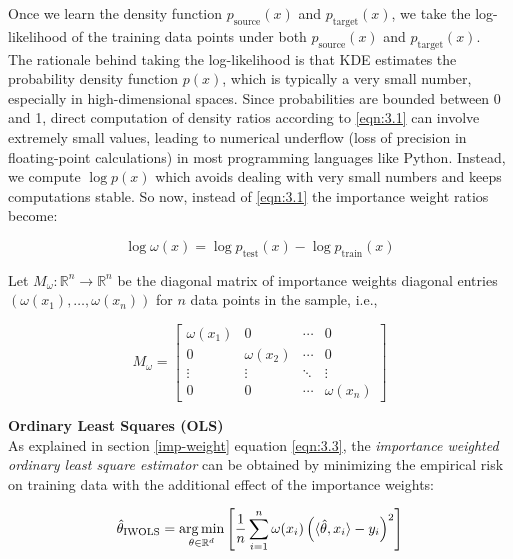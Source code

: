 Once we learn the density function $p_{\text{source}}(x)$ and $p_{\text{target}}(x)$, we take the log-likelihood of the training data points under both $p_{\text{source}}(x)$ and $p_{\text{target}}(x)$.\\

The rationale behind taking the log-likelihood is that KDE estimates the probability density function $p(x)$, which is typically a very small number, especially in high-dimensional spaces. Since probabilities are bounded between 0 and 1, direct computation of density ratios according to \ref{eqn:3.1} can involve extremely small values, leading to numerical underflow (loss of precision in floating-point calculations) in most programming languages like Python. Instead, we compute $\log p(x)$ which avoids dealing with very small numbers and keeps computations stable. So now, instead of \ref{eqn:3.1} the importance weight ratios become:

\begin{equation}
    \log \omega(x) = \log p_{\text{test}}(x) - \log p_{\text{train}}(x) 
    \label{eqn:3.7}
\end{equation}

Let $M_{\omega}: \mathbb{R}^n \to \mathbb{R}^n$ be the diagonal matrix of importance weights diagonal entries $(\omega(x_1), \ldots, \omega(x_n))$ for $n$ data points in the sample, i.e.,

\begin{equation}
    M_{\omega} = \begin{bmatrix}
    \omega(x_1) & 0 & \cdots & 0 \\
    0 & \omega(x_2) & \cdots & 0 \\
    \vdots & \vdots & \ddots & \vdots \\
    0 & 0 & \cdots & \omega(x_n)
    \end{bmatrix}
    \label{eqn:3.8}
\end{equation}

\vspace{1em}
\textbf{Ordinary Least Squares (OLS)}\\

As explained in section \ref{imp-weight} equation \ref{eqn:3.3}, the \emph{importance weighted ordinary least square estimator} can be obtained by minimizing the empirical risk on training data with the additional effect of the importance weights:

\begin{equation}
    \hat{\theta}_{\text{IWOLS}} = \operatorname*{arg\,min}_{\theta \in \mathbb{R}^d} \left[ \frac{1}{n}\sum_{i=1}^{n} \omega(x_i) \left( \langle \hat{\theta}, x_i \rangle - y_i \right)^2 \right]
    \label{eqn:3.9}
\end{equation}

